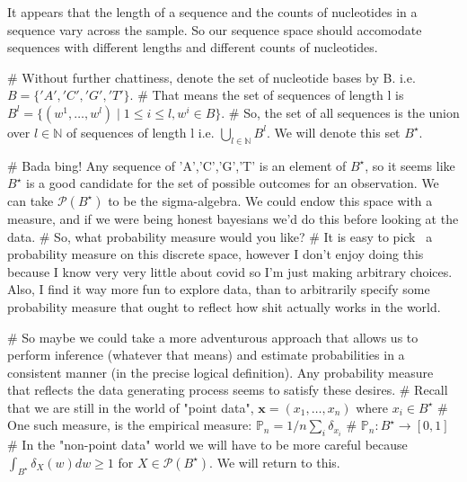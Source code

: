 It appears that the length of a sequence and the counts of nucleotides in a sequence vary across the sample. So our sequence space should accomodate sequences with different lengths and different counts of nucleotides. 

# Without further chattiness, denote the set of nucleotide bases by B. i.e. $B = \{'A','C','G','T'\}$.
# That means the set of sequences of length l is $B^l = \{ (w^1,\dots,w^l) \mid 1\leq i\leq l, w^i \in B \}$.
# So, the set of all sequences is the union over $l \in \mathbb{N}$ of sequences of length l i.e. $\bigcup_{l\in\mathbb{N}} B^l$. We will denote this set $B^\star$.

# Bada bing! Any sequence of 'A','C','G','T' is an element of $B^\star$, so it seems like $B^\star$ is a good candidate for the set of possible outcomes for an observation. We can take $\mathscr{P}(B^\star)$ to be the sigma-algebra. We could endow this space with a measure, and if we were being honest bayesians we'd do this before looking at the data.
# So, what probability measure would you like?
# It is easy to pick ~a~ probability measure on this discrete space, however I don't enjoy doing this because I know very very little about covid so I'm just making arbitrary choices. Also, I find it way more fun to explore data, than to arbitrarily specify some probability measure that ought to reflect how shit actually works in the world.

# So maybe we could take a more adventurous approach that allows us to perform inference (whatever that means) and estimate probabilities in a consistent manner (in the precise logical definition). Any probability measure that reflects the data generating process seems to satisfy these desires.
# Recall that we are still in the world of "point data", $ \mathbf{x} = (x_1,\dots,x_n)$ where $x_i \in B^\star$
# One such measure, is the empirical measure: $\mathbb{P}_n = 1/n \sum_i \delta_{x_i}$
# $\mathbb{P}_n:B^\star\to[0,1]$
# In the "non-point data" world we will have to be more careful because $\int_{B^\star}\delta_{X}(w) dw \ge 1$ for $X \in \mathscr{P}(B^\star) $. We will return to this.

